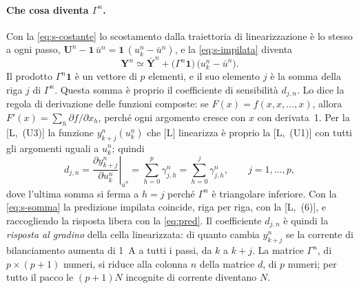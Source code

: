 \documentclass[11pt,a4paper]{article}
\newcommand{\uno}{\mathbf{1}}
\newcommand{\vett}[1]{\boldsymbol{#1}}      %
\begin{document}
\paragraph{Che cosa diventa $\Gamma^n$.} Con la \eqref{eq:s-costante} lo
scostamento dalla traiettoria di linearizzazione è lo stesso a ogni passo,
$\vett{U}^n - \uno\,\bar u^n = \uno\,(u^n_k - \bar u^n)$, e la
\eqref{eq:s-impilata} diventa
\[
  \vett{Y}^n \simeq \bar{\vett{Y}}^n + \bigl(\Gamma^n \uno\bigr)\,\bigl(u^n_k - \bar u^n\bigr) .
\]
Il prodotto $\Gamma^n \uno$ è un vettore di $p$ elementi, e il suo elemento
$j$ è la somma della riga $j$ di $\Gamma^n$. Questa somma è proprio il
coefficiente di sensibilità $d_{j,n}$. Lo dice la regola di derivazione delle
funzioni composte: se $F(x) = f(x, x, \dots, x)$, allora
$F'(x) = \sum_h \partial f / \partial x_h$, perché ogni argomento cresce con
$x$ con derivata~1. Per la [L,~(U3)] la funzione $y^n_{k+j}(u^n_k)$ che [L]
linearizza è proprio la [L,~(U1)] con tutti gli argomenti uguali a $u^n_k$;
quindi
\begin{equation}
  d_{j,n}
  = \left.\frac{\partial y^n_{k+j}}{\partial u^n_k}\right|_{\bar u^n}
  = \sum_{h=0}^{p} \gamma^n_{j,h}
  = \sum_{h=0}^{j} \gamma^n_{j,h} ,
  \qquad j = 1, \dots, p ,
  \tag{S3}\label{eq:s-somma}
\end{equation}
dove l'ultima somma si ferma a $h = j$ perché $\Gamma^n$ è triangolare
inferiore. Con la \eqref{eq:s-somma} la predizione impilata coincide, riga per
riga, con la [L,~(6)], e raccogliendo la risposta libera con la
\eqref{eq:pred}. Il coefficiente $d_{j,n}$ è quindi la \emph{risposta al gradino} della cella
linearizzata: di quanto cambia $y^n_{k+j}$ se la corrente di bilanciamento
aumenta di 1~A a tutti i passi, da $k$ a $k+j$. La matrice $\Gamma^n$, di
$p \times (p+1)$ numeri, si riduce alla colonna $n$ della matrice $d$, di $p$
numeri; per tutto il pacco le $(p+1)N$ incognite di corrente diventano $N$.
\end{document}
